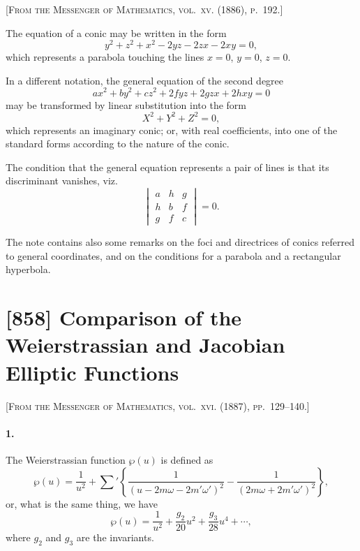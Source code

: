 \documentclass[11pt,a4paper]{article}
\theoremstyle{definition}
\begin{document}
\noindent\textsc{[From the Messenger of Mathematics, vol.~xv. (1886), p.~192.]}

\smallskip

\noindent The equation of a conic may be written in the form
\[
y^{2} + z^{2} + x^{2} - 2yz - 2zx - 2xy = 0,
\]
which represents a parabola touching the lines $x = 0$, $y = 0$, $z = 0$.

\smallskip

\noindent In a different notation, the general equation of the second degree
\[
ax^{2} + by^{2} + cz^{2} + 2fyz + 2gzx + 2hxy = 0
\]
may be transformed by linear substitution into the form
\[
X^{2} + Y^{2} + Z^{2} = 0,
\]
which represents an imaginary conic; or, with real coefficients, into one of the standard forms according to the nature of the conic.

\smallskip

\noindent The condition that the general equation represents a pair of lines is that its discriminant vanishes, viz.
\[
\begin{vmatrix}
a & h & g \\
h & b & f \\
g & f & c
\end{vmatrix} = 0.
\]

\smallskip

\noindent The note contains also some remarks on the foci and directrices of conics referred to general coordinates, and on the conditions for a parabola and a rectangular hyperbola.

\newpage
\section*{[858] Comparison of the Weierstrassian and Jacobian Elliptic Functions}

\noindent\textsc{[From the Messenger of Mathematics, vol.~xvi. (1887), pp.~129--140.]}

\smallskip

\paragraph{1.} The Weierstrassian function $\wp(u)$ is defined as
\[
\wp(u) = \frac{1}{u^{2}} + \sum'\left\{\frac{1}{(u - 2m\omega - 2m'\omega')^{2}} - \frac{1}{(2m\omega + 2m'\omega')^{2}}\right\},
\]
or, what is the same thing, we have
\[
\wp(u) = \frac{1}{u^{2}} + \frac{g_{2}}{20}u^{2} + \frac{g_{3}}{28}u^{4} + \cdots,
\]
where $g_{2}$ and $g_{3}$ are the invariants.
\end{document}
